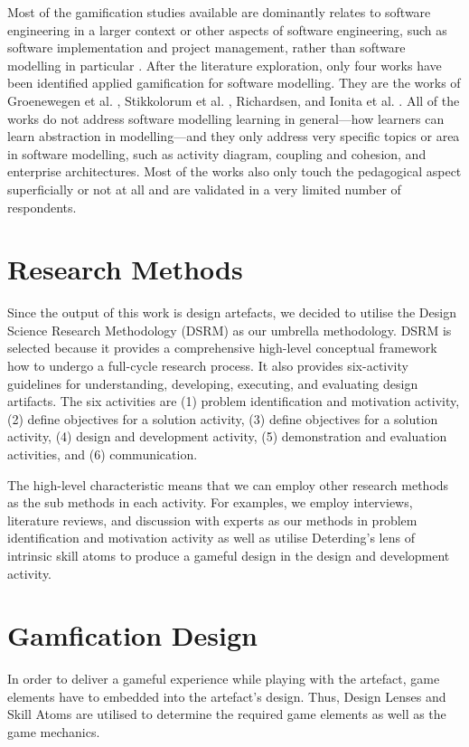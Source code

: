 \documentclass[runningheads,a4paper]{llncs}
\begin{document}
Most of the gamification studies available are dominantly relates to software engineering in a larger context or other aspects of software engineering, such as software implementation and project management, rather than software modelling in particular \cite{Pedreira2015}. After the literature exploration, only four works have been identified applied gamification for software modelling. They are the works of Groenewegen et al. \cite{Groenewegen2010}, Stikkolorum et al. \cite{Stikkolorum2014}, Richardsen\cite{Richardsen2014}, and Ionita et al. \cite{Ionita2015}. All of the works do not address software modelling learning in general---how learners can learn abstraction in modelling---and they only address very specific topics or area in software modelling, such as activity diagram, coupling and cohesion, and enterprise architectures. Most of the works also only touch the pedagogical aspect superficially or not at all and are validated in a very limited number of respondents. 

\section{Research Methods}
Since the output of this work is design artefacts, we decided to utilise the Design Science Research Methodology (DSRM) \cite{peffers2007design} as our umbrella methodology. DSRM is selected because it provides a comprehensive high-level conceptual framework how to undergo a full-cycle research process. It also provides six-activity guidelines for understanding, developing, executing, and evaluating design artifacts. The six activities are (1) problem identification and motivation activity, (2) define objectives for a solution activity, (3) define objectives for a solution activity, (4) design and development activity, (5) demonstration and evaluation activities, and (6) communication. 

The high-level characteristic means that we can employ other research methods as the sub methods in each activity. For examples, we employ interviews, literature reviews, and discussion with experts as our methods in problem identification and motivation activity as well as utilise Deterding's lens of intrinsic skill atoms \cite{deterding2015lens} to produce a gameful design in the design and development activity.

\section{Gamfication Design}
In order to deliver a gameful experience while playing with the artefact, game elements have to embedded into the artefact's design. Thus, Design Lenses and Skill Atoms \cite{deterding2015lens} are utilised to determine the required game elements as well as the game mechanics. 
\end{document}
